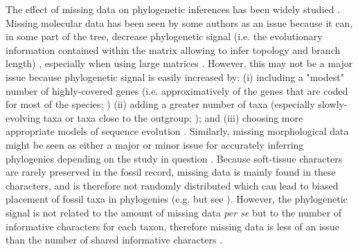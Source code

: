 \documentclass[12pt,letterpaper]{article}
\begin{document}
The effect of missing data on phylogenetic inferences has been widely studied \citep{wiensmissing2003,wiensmissing2006,wiensmissing2008,lemmonthe2009,rouresite-specific2011,sansomfossilization2013,pattinsonphylogeny2014,wrightbayesian2014}. Missing molecular data has been seen by some authors as an issue because it can, in some part of the tree, decrease phylogenetic signal (i.e. the evolutionary information contained within the matrix allowing to infer topology and branch length)%
    , especially when using large matrices \citep{lemmonthe2009}. However, this may not be a major issue because phylogenetic signal is easily increased by:
(i) including a "modest" number of highly-covered genes (i.e. approximatively of the genes that are coded for most of the species; \citealt{rouresite-specific2011}) %
(ii) adding a greater number of taxa (especially slowly-evolving taxa or taxa close to the outgroup; \citealt{rouresite-specific2011}); and (iii) choosing more appropriate models of sequence evolution \citep{wiensmissing2006,wiensmissing2008,rouresite-specific2011}. Similarly, missing morphological data might be seen as either a major or minor issue for accurately inferring phylogenies depending on the study in question \citep{wiensmissing2003,sansomfossilization2013,pattinsonphylogeny2014}. Because soft-tissue characters are rarely preserved in the fossil record, missing data is mainly found in these characters, and is therefore not randomly distributed which can lead to biased placement of fossil taxa in phylogenies (e.g. \citeauthor{sansomfossilization2013} \citeyear{sansomfossilization2013} but see \citeauthor{pattinsonphylogeny2014} \citeyear{pattinsonphylogeny2014}). However, the phylogenetic signal is not related to the amount of missing data \textit{per se} but to the number of informative characters for each taxon, therefore missing data is less of an issue than the number of shared informative characters \citep{wiensmissing2003}.
\end{document}

